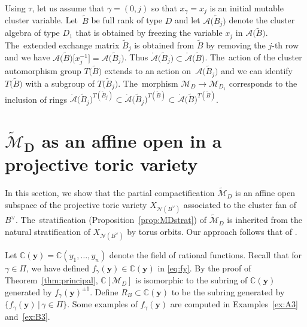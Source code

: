 \documentclass[10pt,a4paper]{amsart}
\def\C{{\mathbb C}}
\def\A{{\mathcal{A}}}
\def\Ao{{\mathring{\A}}}
\def\tB{{\tilde B}}
\def\M{{\mathcal{M}}}
\def\tM{{\widetilde {\mathcal{M}}}}
\def\tB{{\tilde B}}
\def\y{{\mathbf y}}
\def\N{{\mathcal{N}}}
\numberwithin{equation}{section}
\begin{document}
\bigskip{} %
Using $\tau$, let us assume that $\gamma = (0,j)$ so that $x_\gamma = x_j$ is an initial mutable cluster variable. Let~$\tB$ be full rank of type $D$ and let $\A\big(\tB_j\big)$ denote the cluster algebra of type $D_1$ that is obtained by freezing the variable $x_j$ in $\A\big(\tB\big)$. The~extended exchange matrix $\tB_j$ is obtained from $\tB$ by removing the $j$-th row and we have $\A\big(\tB\big)\big[x_j^{-1}\big] = \A\big(\tB_j\big)$. Thus $\Ao\big(\tB_j\big) \subset \Ao\big(\tB\big)$. The~action of the cluster automorphism group $T\big(\tB\big)$ extends to an action on~$\A\big(\tB_j\big)$ and we can identify $T\big(\tB\big)$ with a subgroup of $T\big(\tB_j\big)$. The~morphism $\M_{D} \to \M_{D_1}$ corresponds to the inclusion of rings $\Ao\big(\tB_j\big)^{T(\tB_j)} \subset \Ao\big(\tB_j\big)^{T(\tB)} \subset \Ao\big(\tB\big)^{T(\tB)}$.

\section[MD as an affine open in a projective toric variety]
{$\boldsymbol{\tM_D}$ as an affine open in a projective toric variety}

In this section, we show that the partial compactification $\tM_D$ is an affine open subspace of the projective toric variety $X_{\N(B^\vee)}$ associated to the cluster fan of $B^\vee$. The~stratification (Proposition~\ref{prop:MDstrat}) of $\tM_D$ is inherited from the natural stratification of $X_{\N(B^\vee)}$ by torus orbits. Our approach follows that of \cite{AHL}.

\bigskip{}
Let $\C(\y) = \C(y_1,\dots,y_n)$ denote the field of rational functions. Recall that for $\gamma \in \Pi$, we have defined $f_\gamma(\y) \in \C(\y)$ in \eqref{eq:fy}.
By the proof of Theorem~\ref{thm:principal}, $\C[\M_D]$ is isomorphic to the subring of $\C(\y)$ generated by $f_\gamma(\y)^{\pm 1}$. Define $R_B \subset \C(\y)$ to be the subring generated by $\{f_\gamma(\y) \,|\, \gamma \in \Pi\}$. Some examples of $f_\gamma(\y)$ are computed in Examples~\ref{ex:A3} and~\ref{ex:B3}.
\end{document}
